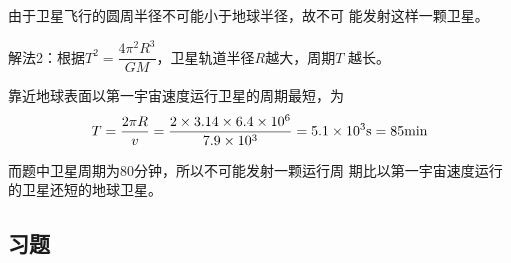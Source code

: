 \begin{enumerate}
\begin{solution}
由于卫星飞行的圆周半径不可能小于地球半径，故不可
能发射这样一颗卫星。

解法2：根据$T^2=\dfrac{4\pi^2R^3}{GM}$，卫星轨道半径$R$越大，周期$T$
越长。

靠近地球表面以第一宇宙速度运行卫星的周期最短，为
\[T=\frac{2\pi R}{v}=\frac{2\times 3.14\times 6.4\times 10^{6}}{7.9\times 10^3}=5.1\times 10^3{\rm s}=85{\rm min}\]

而题中卫星周期为80分钟，所以不可能发射一颗运行周
期比以第一宇宙速度运行的卫星还短的地球卫星。
\end{solution}

\end{enumerate}





\subsection{习题}

